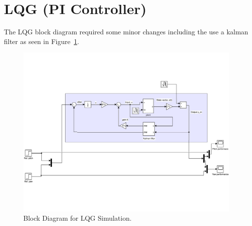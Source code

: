 \section{LQG (PI Controller)}
The LQG block diagram required some minor changes including the use a kalman filter as seen in Figure~\ref{fig:LQG_Sim_Block_Diagram}.
\begin{figure}[!htbp]
    \centering
    \includegraphics[width=.8\textwidth,keepaspectratio=true]{figs/img/LQG_Simulink}
    \caption{Block Diagram for LQG Simulation.}
    \label{fig:LQG_Sim_Block_Diagram}
\end{figure}
